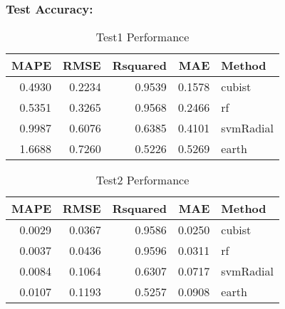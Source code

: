 \documentclass[]{report}
\begin{document}
\hypertarget{test-accuracy}{%
\subsubsection{Test Accuracy:}\label{test-accuracy}}

\begin{table}[H]

\caption{\label{tab:unnamed-chunk-2}Test1 Performance}
\centering
\fontsize{8}{10}\selectfont
\begin{tabular}{rrrrl}
\toprule
MAPE & RMSE & Rsquared & MAE & Method\\
\midrule
\rowcolor{gray!6}  0.4930 & 0.2234 & 0.9539 & 0.1578 & cubist\\
0.5351 & 0.3265 & 0.9568 & 0.2466 & rf\\
\rowcolor{gray!6}  0.9987 & 0.6076 & 0.6385 & 0.4101 & svmRadial\\
1.6688 & 0.7260 & 0.5226 & 0.5269 & earth\\
\bottomrule
\end{tabular}
\end{table}

\begin{table}[H]

\caption{\label{tab:unnamed-chunk-2}Test2 Performance}
\centering
\fontsize{8}{10}\selectfont
\begin{tabular}{rrrrl}
\toprule
MAPE & RMSE & Rsquared & MAE & Method\\
\midrule
\rowcolor{gray!6}  0.0029 & 0.0367 & 0.9586 & 0.0250 & cubist\\
0.0037 & 0.0436 & 0.9596 & 0.0311 & rf\\
\rowcolor{gray!6}  0.0084 & 0.1064 & 0.6307 & 0.0717 & svmRadial\\
0.0107 & 0.1193 & 0.5257 & 0.0908 & earth\\
\bottomrule
\end{tabular}
\end{table}
\end{document}
